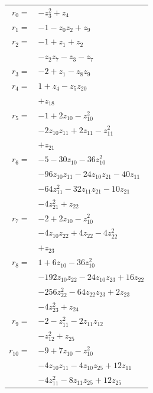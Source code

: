 \begingroup
\small
\setlength{\tabcolsep}{2pt}
\begin{longtable}{@{}r@{\;}l@{}}
\(r_{0}=\) & \(\displaystyle -z_{3}^{2} +z_{4}\) \\[3pt]
\(r_{1}=\) & \(\displaystyle -1 -z_{0}z_{2} +z_{9}\) \\[3pt]
\(r_{2}=\) & \(\displaystyle -1 +z_{1} +z_{2}\) \\
 & \(\displaystyle -z_{2}z_{7} -z_{3} -z_{7}\) \\[3pt]
\(r_{3}=\) & \(\displaystyle -2 +z_{1} -z_{8}z_{9}\) \\[3pt]
\(r_{4}=\) & \(\displaystyle 1 +z_{4} -z_{5}z_{20}\) \\
 & \(\displaystyle +z_{18}\) \\[3pt]
\(r_{5}=\) & \(\displaystyle -1 +2z_{10} -z_{10}^{2}\) \\
 & \(\displaystyle -2z_{10}z_{11} +2z_{11} -z_{11}^{2}\) \\
 & \(\displaystyle +z_{21}\) \\[3pt]
\(r_{6}=\) & \(\displaystyle -5 -30z_{10} -36z_{10}^{2}\) \\
 & \(\displaystyle -96z_{10}z_{11} -24z_{10}z_{21} -40z_{11}\) \\
 & \(\displaystyle -64z_{11}^{2} -32z_{11}z_{21} -10z_{21}\) \\
 & \(\displaystyle -4z_{21}^{2} +z_{22}\) \\[3pt]
\(r_{7}=\) & \(\displaystyle -2 +2z_{10} -z_{10}^{2}\) \\
 & \(\displaystyle -4z_{10}z_{22} +4z_{22} -4z_{22}^{2}\) \\
 & \(\displaystyle +z_{23}\) \\[3pt]
\(r_{8}=\) & \(\displaystyle 1 +6z_{10} -36z_{10}^{2}\) \\
 & \(\displaystyle -192z_{10}z_{22} -24z_{10}z_{23} +16z_{22}\) \\
 & \(\displaystyle -256z_{22}^{2} -64z_{22}z_{23} +2z_{23}\) \\
 & \(\displaystyle -4z_{23}^{2} +z_{24}\) \\[3pt]
\(r_{9}=\) & \(\displaystyle -2 -z_{11}^{2} -2z_{11}z_{12}\) \\
 & \(\displaystyle -z_{12}^{2} +z_{25}\) \\[3pt]
\(r_{10}=\) & \(\displaystyle -9 +7z_{10} -z_{10}^{2}\) \\
 & \(\displaystyle -4z_{10}z_{11} -4z_{10}z_{25} +12z_{11}\) \\
 & \(\displaystyle -4z_{11}^{2} -8z_{11}z_{25} +12z_{25}\) \\

\end{longtable}
